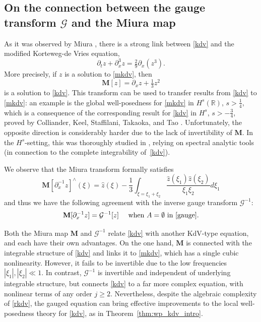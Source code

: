 \documentclass[a4paper,
11pt,  reqno]{amsart}
\newcommand{\5}{\textup{V}}
\newcommand{\noi}{\noindent}
\newcommand{\dx}{\partial_x}
\theoremstyle{remark}
\newcommand{\R}{\mathbb{R}}
\newcommand{\MMb}{\mathbf{M}}
\newcommand{\Gc}{\mathcal{G}}
\numberwithin{equation}{section}
\numberwithin{theorem}{section}
\begin{document}
    \subsection{On the connection between the gauge transform $\Gc$ and the Miura map}\label{SUBSEC:miura}
		As it was observed by Miura \cite{Miura}, there is a strong link between \eqref{kdv} and the modified Korteweg-de Vries equation,
		\begin{equation}
			\tag{mKdV}\label{mkdv}
			\partial_t z + \partial_x^3 z = \tfrac29 \partial_x(z^3).
		\end{equation}
		More precisely, if $z$ is a solution to \eqref{mkdv}, then
		\begin{equation}\label{eq:defiMiura}
			\MMb[z]=\partial_x z +\tfrac{1}{3}z^2
		\end{equation}
		is a solution to \eqref{kdv}. This transform can be used to transfer results from \eqref{kdv} to \eqref{mkdv}: an example is the global well-posedness for \eqref{mkdv} in $H^s(\R)$, $s>\frac14$, which is a consequence of the corresponding result for \eqref{kdv} in $H^s$, $s>-\frac34$, proved by Colliander, Keel, Staffilani, Takaoka, and Tao \cite{CKSTT_sharp_kdv}. Unfortunately, the opposite direction is considerably harder due to the lack of invertibility of $\MMb$. In the $H^s$-setting, this was thoroughly studied in  \cite{BuckmasterKoch, KPST_miura}, relying on spectral analytic tools (in connection to the complete integrability of~\eqref{kdv}).

		We observe that the Miura transform formally satisfies
		\begin{equation}\label{eq:miura2}
			{\MMb[\partial_x^{-1}z]}^\wedge(\xi) = \widehat{z}(\xi)-\frac{1}{3}\int_{\xi=\xi_1+\xi_2} \frac{\widehat{z}(\xi_1)\widehat{z}(\xi_2)}{\xi_1\xi_2}d\xi_1
		\end{equation}
        and thus we have the following agreement with the inverse gauge transform $\Gc^{-1}$:
        \begin{equation}
\MMb[\dx^{-1} z]=\Gc^{-1}[z]\quad \mbox{ when }A=\emptyset\mbox{ in }\eqref{gauge}.
        \end{equation}

{
\noi
Both the Miura map $\MMb$ and $\Gc^{-1}$ relate \eqref{kdv} with another KdV-type equation, and each have their own advantages.
On the one hand, $\MMb$ is connected with the integrable structure of \eqref{kdv} and links it to \eqref{mkdv}, which has a single cubic nonlinearity. However, it fails to be invertible due to the low frequencies $|\xi_1|, |\xi_2|\ll 1$.
In contrast, $\Gc^{-1}$ is invertible and independent of underlying integrable structure, but connects \eqref{kdv} to a far more complex equation, with nonlinear terms of any order $j\ge2$. Nevertheless, despite  the algebraic complexity of \eqref{rkdv}, the gauged equation can bring effective improvements to the local well-posedness theory for \eqref{kdv}, as in Theorem~\ref{thm:wp_kdv_intro}.

}
\end{document}
